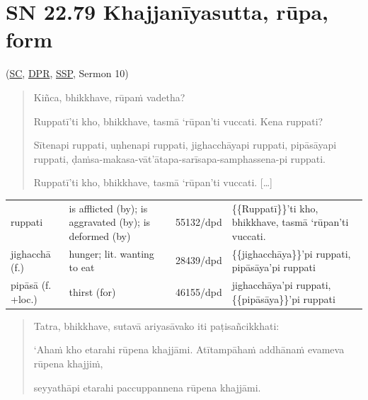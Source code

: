 \documentclass[11pt,oneside]{memoir}
\begin{document}

\clearpage

\section{SN 22.79 Khajjanīyasutta, rūpa, form}
\label{sec:orga23553b}
(\href{https://suttacentral.net/sn22.79/pli/ms}{SC}, \href{https://www.digitalpalireader.online/\_dprhtml/index.html?loc=s.2.0.0.0.7.6.m}{DPR}, \href{http://localhost:4848/suttas/sn22.79/pli/ms?quote=Ki\%25C3\%25B1ca\%252C\%2520bhikkhave\%252C\%2520r\%25C5\%25ABpa\%25E1\%25B9\%2581\%2520vadetha\%253F\&window\_type=Sutta+Study}{SSP}, Sermon 10)

\casesLegendHeaderBGHere

\begin{quote}
Kiñca, bhikkhave, rūpaṁ vadetha?

Ruppatī'ti kho, bhikkhave, tasmā ‘rūpan’ti vuccati. Kena ruppati?

Sītenapi ruppati, uṇhenapi ruppati, jighacchāyapi ruppati, pipāsāyapi ruppati,
ḍaṁsa-makasa-vāt'ātapa-sarīsapa-samphassena-pi ruppati.

Ruppatī'ti kho, bhikkhave, tasmā ‘rūpan’ti vuccati. [\ldots{}]
\end{quote}

\begin{longtable}{L{\colOne} L{\colTwo} H H}
ruppati & is afflicted (by); is aggravated (by); is deformed (by) & 55132/dpd & \{\{Ruppatī\}\}'ti kho, bhikkhave, tasmā ‘rūpan’ti vuccati.\\[0pt]
jighacchā (f.) & hunger; lit. wanting to eat & 28439/dpd & \{\{jighacchāya\}\}'pi ruppati, pipāsāya'pi ruppati\\[0pt]
pipāsā (f. +loc.) & thirst (for) & 46155/dpd & jighacchāya'pi ruppati, \{\{pipāsāya\}\}'pi ruppati\\[0pt]
\end{longtable}

\begin{quote}
Tatra, bhikkhave, sutavā ariyasāvako iti paṭisañcikkhati:

‘Ahaṁ kho etarahi rūpena khajjāmi. Atītampāhaṁ addhānaṁ evameva rūpena khajjiṁ,

seyyathāpi etarahi paccuppannena rūpena khajjāmi.
\end{quote}
\end{document}

